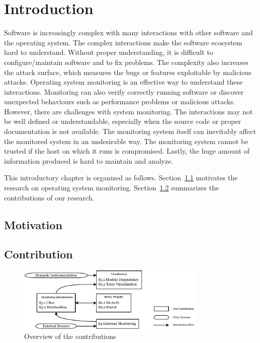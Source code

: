 \chapter{Introduction}

Software is increasingly complex with many interactions with other software
and the operating system.
The complex interactions make the software ecosystem hard to understand.
Without proper understanding,
it is difficult to configure/maintain software and to fix problems.
The complexity also increases the attack surface, which measures the
bugs or features exploitable by malicious attacks.
Operating system monitoring is an effective way to understand these
interactions.
Monitoring can also verify correctly running software or discover
unexpected behaviours such as performance problems or malicious attacks.
However, there are challenges with system monitoring.
The interactions may not be well defined or understandable,
especially when the source code or proper documentation is not available.
The monitoring system itself can inevitably affect the monitored system
in an undesirable way.
The monitoring system cannot be trusted if the host on which it
runs is compromised.
Lastly, the huge amount of information produced is hard to maintain and
analyze.

This introductory chapter is organized as follows.
Section~\ref{sec:motivation} motivates the research on operating system monitoring.
Section~\ref{sec:contribution} summarizes the contributions of our research.

\section{Motivation}
\label{sec:motivation}


\section{Contribution}
\label{sec:contribution}

\begin{figure}[htb]
\centering
\includegraphics[width=0.8\textwidth]{overview.pdf}
\caption{Overview of the contributions}
\label{fig:overview}
\end{figure}


